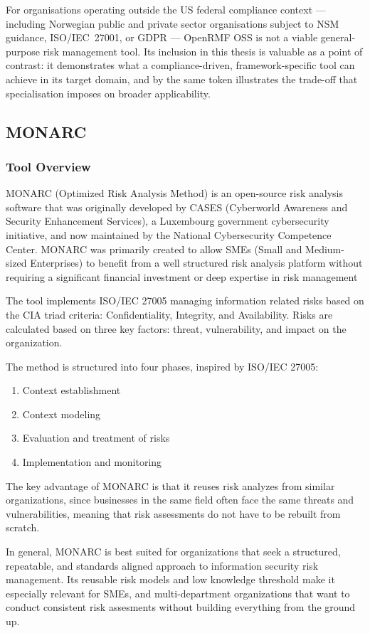 For organisations operating outside the US federal compliance context —
including Norwegian public and private sector organisations subject to NSM
guidance, ISO/IEC~27001, or GDPR — OpenRMF OSS is not a viable
general-purpose risk management tool. Its inclusion in this thesis is
valuable as a point of contrast: it demonstrates what a compliance-driven,
framework-specific tool can achieve in its target domain, and by the same
token illustrates the trade-off that specialisation imposes on broader
applicability.


\subsection{MONARC}

\subsubsection{Tool Overview}
MONARC (Optimized Risk Analysis Method) is an open-source risk analysis software that was originally developed by CASES (Cyberworld Awareness and Security Enhancement Services), a Luxembourg government cybersecurity initiative, and now maintained by the National Cybersecurity Competence Center. MONARC was primarily created to allow SMEs (Small and Medium-sized Enterprises) to benefit from a well structured risk analysis platform without requiring a significant financial investment or deep expertise in risk management 

The tool implements ISO/IEC 27005 managing information related risks based on the CIA triad criteria: Confidentiality, Integrity, and Availability. Risks are calculated based on three key factors: threat, vulnerability, and impact on the organization.

The method is structured into four phases, inspired by ISO/IEC 27005: 
\begin{enumerate}
    \item Context establishment
    \item Context modeling
    \item Evaluation and treatment of risks
    \item Implementation and monitoring
\end{enumerate}
The key advantage of MONARC is that it reuses risk analyzes from similar organizations, since businesses in the same field often face the same threats and vulnerabilities, meaning that risk assessments do not have to be rebuilt from scratch.

In general, MONARC is best suited for organizations that seek a structured, repeatable, and standards aligned approach to information security risk management. Its reusable risk models and low knowledge threshold make it especially relevant for SMEs, and multi-department organizations that want to conduct consistent risk assesments without building everything from the ground up.

